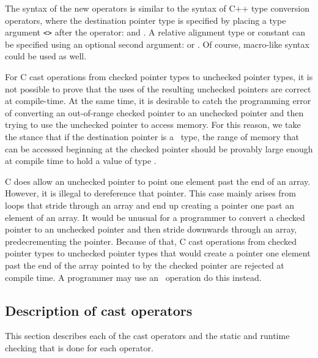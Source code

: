 The syntax of the new operators is similar to the syntax of C++ type
conversion operators, where the destination pointer type is specified by
placing a type argument \texttt{<>} after the operator: 
and .   A relative alignment type or constant can be
specified using an optional second argument:  
 or .
Of course, macro-like syntax could be used as well.

For C cast operations from checked pointer types to unchecked pointer types,
it is not possible to prove that the uses of the resulting unchecked pointers
are correct at compile-time.   At the same
time, it is desirable to  catch the programming error of converting an out-of-range
checked pointer to an unchecked pointer and then trying to use the unchecked
pointer to access memory.  For this reason, we take the stance that if the
destination pointer is a \uncheckedptrT\ type, the range of memory that can be accessed
beginning at the checked pointer should be provably large enough at compile time
to hold a value of type .

C does allow an unchecked pointer to point one element past the end of an array.
However, it is illegal to dereference that pointer.  This case mainly arises
from loops that stride through an array and end up creating a pointer one past
an element of an array.  It would be unusual for a programmer to
convert a checked pointer to an unchecked pointer and then stride downwards through an array,
predecrementing the pointer.  Because of that, C cast operations from checked pointer
types to unchecked pointer types that would create a pointer one element past
the end of the array pointed to by the checked pointer are rejected at compile time.
A programmer may use an \assumeboundscast\ operation do this instead.

\subsection{Description of cast operators}
\label{subsection:cast-operator-description}

This section describes each of the cast operators and the static
and runtime checking that is done for each operator.   

